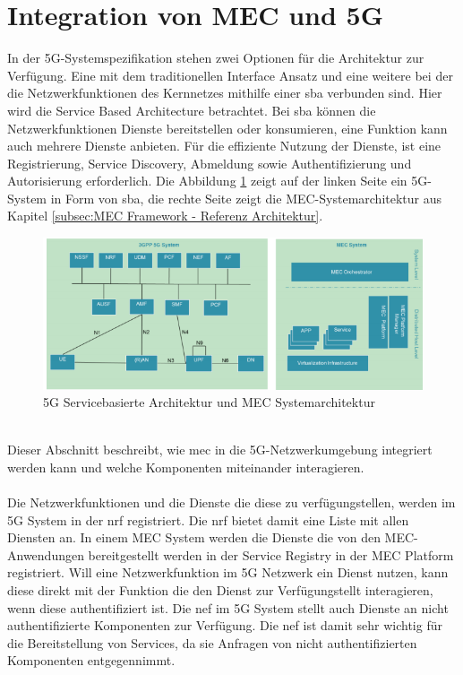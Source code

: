 \documentclass[runningheads]{llncs}
\numberwithin{figure}{section}
\begin{document}
\section{Integration von MEC und 5G}
In der 5G-Systemspezifikation stehen zwei Optionen für die Architektur zur Verfügung. 
Eine mit dem traditionellen Interface Ansatz und eine weitere 
bei der die Netzwerkfunktionen des Kernnetzes mithilfe einer \acrfull{sba} verbunden sind. 
Hier wird die Service Based Architecture betrachtet. Bei \acrshort{sba} können die Netzwerkfunktionen Dienste bereitstellen oder konsumieren, eine
Funktion kann auch mehrere Dienste anbieten. 
Für die effiziente Nutzung der Dienste, 
ist eine Registrierung, Service Discovery, Abmeldung sowie Authentifizierung und Autorisierung erforderlich.
Die Abbildung \ref{fig:sba} zeigt auf der linken Seite ein 5G-System in Form von \acrshort{sba}, 
die rechte Seite zeigt die MEC-Systemarchitektur aus Kapitel \ref{subsec:MEC Framework - Referenz Architektur}.
\begin{figure}
  \includegraphics[width=\linewidth]{images/5GMEC-System-Architecture.png}
  \caption{5G Servicebasierte Architektur und MEC Systemarchitektur \cite{arnold5GRadioAccess2017} \cite{etsiETSIGSMEC}}
  \label{fig:sba}
\end{figure}
\\
Dieser Abschnitt beschreibt, wie \acrfull{mec} in die 5G-Netzwerkumgebung integriert werden kann 
und welche Komponenten miteinander interagieren.
\\
\\
Die Netzwerkfunktionen und die Dienste die diese zu verfügungstellen, werden im 5G System in der \acrfull{nrf} registriert.
Die \acrshort{nrf} bietet damit eine Liste mit allen Diensten an. 
In einem MEC System werden die Dienste die von den MEC- Anwendungen bereitgestellt werden in der Service Registry in der MEC Platform registriert.
Will eine Netzwerkfunktion im 5G Netzwerk ein Dienst nutzen, kann diese direkt mit der Funktion die den Dienst zur Verfügungstellt interagieren,
wenn diese au­then­ti­fi­zie­rt ist. Die \acrfull{nef} im 5G System stellt auch Dienste an nicht au­then­ti­fi­zie­rte Komponenten 
zur Verfügung. Die \acrshort{nef} ist damit sehr wichtig für die Bereitstellung von Services, da sie Anfragen von nicht authentifizierten Komponenten
entgegennimmt.
\\
\\
\end{document}

